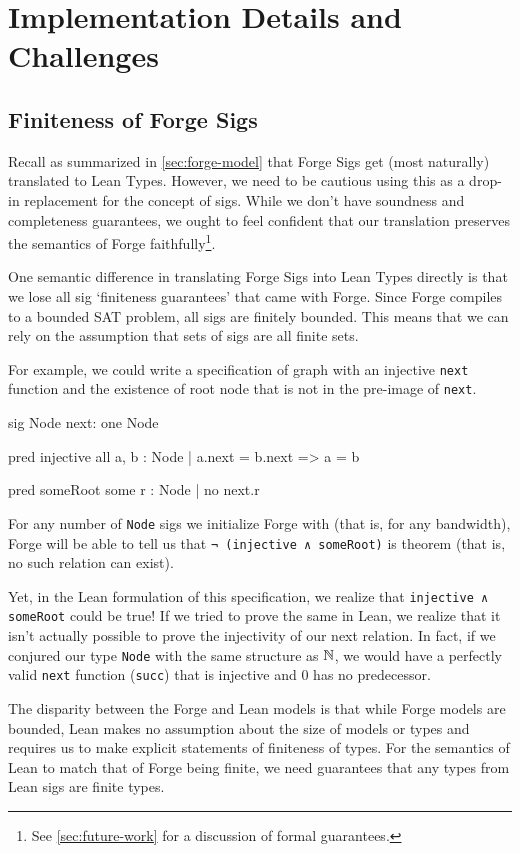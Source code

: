 \section{Implementation Details and Challenges}

\subsection{Finiteness of Forge Sigs}\label{sec:finiteness}
Recall as summarized in \cref{sec:forge-model} that Forge Sigs get (most naturally) translated to Lean Types. However, we need to be cautious using this as a drop-in replacement for the concept of sigs. While we don't have soundness and completeness guarantees, we ought to feel confident that our translation preserves the semantics of Forge faithfully\footnote{See \cref{sec:future-work} for a discussion of formal guarantees.}. 

One semantic difference in translating Forge Sigs into Lean Types directly is that we lose all sig `finiteness guarantees' that came with Forge. Since Forge compiles to a bounded SAT problem, all sigs are finitely bounded. This means that we can rely on the assumption that sets of sigs are all finite sets. 

For example, we could write a specification of graph with an injective \texttt{next} function and the existence of root node that is not in the pre-image of \texttt{next}. 
\begin{forge*}
sig Node {
  next: one Node
}

pred injective {
  all a, b : Node | 
    a.next = b.next => a = b
}

pred someRoot {
  some r : Node | 
    no next.r
}
\end{forge*}
For any number of \texttt{Node} sigs we initialize Forge with (that is, for any bandwidth), Forge will be able to tell us that \texttt{¬ (injective ∧ someRoot)} is theorem (that is, no such relation can exist). 

Yet, in the Lean formulation of this specification, we realize that \texttt{injective ∧ someRoot} could be true! If we tried to prove the same in Lean, we realize that it isn't actually possible to prove the injectivity of our next relation. In fact, if we conjured our type \texttt{Node} with the same structure as $\mathbb N$, we would have a perfectly valid \texttt{next} function (\texttt{succ}) that is injective and $0$ has no predecessor. 

The disparity between the Forge and Lean models is that while Forge models are bounded, Lean makes no assumption about the size of models or types and requires us to make explicit statements of finiteness of types. For the semantics of Lean to match that of Forge being finite, we need guarantees that any types from Lean sigs are finite types. 

